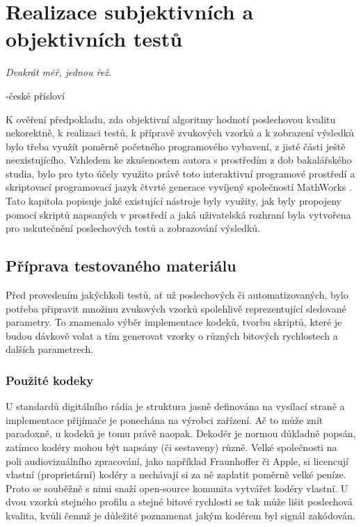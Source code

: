 \chapter{Realizace subjektivních a objektivních testů}
\label{chap:realization}

\epigraph{\textit{\hfill Dvakrát měř, jednou řež.}}{-české přísloví}

K ověření předpokladu, zda objektivní algoritmy hodnotí poslechovou kvalitu nekorektně, k realizaci testů, k přípravě zvukových vzorků a k zobrazení výsledků bylo třeba využít poměrně početného programového vybavení, z jisté části ještě neexistujícího. Vzhledem ke zkušenostem autora s prostředím \matlab z dob bakalářského studia, bylo pro tyto účely využito právě toto interaktivní programové prostředí a skriptovací programovací jazyk čtvrté generace vyvíjený společností MathWorks \cite{web:matlab}. Tato kapitola popisuje jaké existující nástroje byly využity, jak byly propojeny pomocí skriptů napsaných v prostředí \matlab a jaká uživatelská rozhraní byla vytvořena pro uskutečnění poslechových testů a zobrazování výsledků.

\section{Příprava testovaného materiálu}

Před provedením jakýchkoli testů, ať už poslechových či automatizovaných, bylo potřeba připravit množinu zvukových vzorků spolehlivě reprezentující sledované parametry. To znamenalo výběr implementace kodeků, tvorbu skriptů, které je budou dávkově volat a tím generovat vzorky o různých bitových rychlostech a dalších parametrech.

\subsection{Použité kodeky}

U standardů digitálního rádia je struktura jasně definována na vysílací straně a implementace přijímače je ponechána na výrobci zařízení. Ač to může znít paradoxně, u kodeků je tomu právě naopak. Dekodér je normou důkladně popsán, zatímco kodéry mohou být napsány (či sestaveny) různě. Velké společnosti na poli audiovizuálního zpracování, jako například Fraunhoffer či Apple, si licencují vlastní (proprietární) kodéry a nechávají si za ně zaplatit poměrně velké peníze. Proto se souběžně s nimi snaží open-source komunita vytvářet kodéry vlastní. U dvou vzorků stejného profilu a stejné bitové rychlosti se tak může lišit poslechová kvalita, kvůli čemuž je důležité poznamenat jakým kodérem byl signál zakódován.

